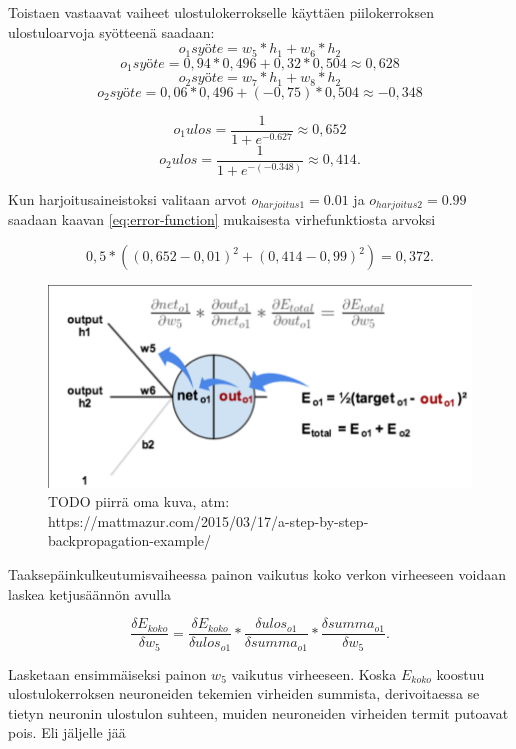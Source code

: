 \documentclass[finnish]{tktltiki2}
\theoremstyle{definition}
\theoremstyle{remark}
\begin{document}
  Toistaen vastaavat vaiheet ulostulokerrokselle käyttäen piilokerroksen ulostuloarvoja syötteenä saadaan:
  $$o_{1}syöte = w_5 * h_1 + w_6 * h_2$$
  $$o_{1}syöte = 0,94 * 0,496 + 0,32 * 0,504 \approx 0,628$$
  $$o_{2}syöte = w_7 * h_1 + w_8 * h_2$$
  $$o_{2}syöte = 0,06 * 0,496 + (-0,75) * 0,504 \approx -0,348$$

  $$o_{1}ulos = \frac{1}{1 + e^{-0.627}} \approx 0,652$$
  $$o_{2}ulos = \frac{1}{1 + e^{-(-0.348)}} \approx 0,414.$$

  Kun harjoitusaineistoksi valitaan arvot $o_{harjoitus1} = 0.01$ ja $o_{harjoitus2} = 0.99$ saadaan kaavan \ref{eq:error-function} mukaisesta virhefunktiosta arvoksi

  $$ 0,5 * ( (0,652 - 0,01)^2 + (0,414 - 0,99)^2 ) = 0,372. $$
  
    \begin{figure}[h]
    \centering
    \includegraphics[scale=0.4]{chain-rule}
    \caption{TODO piirrä oma kuva, atm: https://mattmazur.com/2015/03/17/a-step-by-step-backpropagation-example/}
    \label{pic:chain-rule}
    \end{figure}

  Taaksepäinkulkeutumisvaiheessa painon vaikutus koko verkon virheeseen voidaan laskea ketjusäännön avulla

  $$ \frac{\delta E_{koko}}{\delta w_5} = \frac{\delta E_{koko}}{\delta ulos_{o1}} * \frac{\delta ulos_{o1}}{\delta summa_{o1}} * \frac{\delta summa_{o1}}{\delta w_5}. $$

  Lasketaan ensimmäiseksi painon $w_5$ vaikutus virheeseen. Koska $E_{koko}$ koostuu ulostulokerroksen neuroneiden tekemien virheiden summista, derivoitaessa se tietyn neuronin ulostulon suhteen, muiden neuroneiden virheiden termit putoavat pois. Eli jäljelle jää 
  
\end{document}
